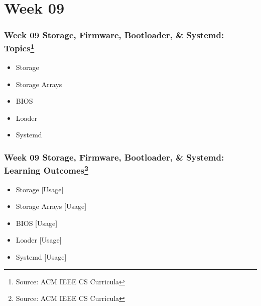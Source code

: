 
\section{Week 09}
\begin{frame}[fragile]
\frametitle{Week 09 Storage, Firmware, Bootloader, \& Systemd:
Topics\footnote{Source: ACM IEEE CS Curricula}}

\begin{itemize}
\item 
Storage
\item
Storage Arrays
\item
BIOS
\item
Loader
\item
Systemd
\end{itemize}
\end{frame}

\begin{frame}[fragile]
\frametitle{Week 09 Storage, Firmware, Bootloader, \& Systemd:
Learning Outcomes\footnote{Source: ACM IEEE CS Curricula}}
\begin{itemize}
\item 
Storage
[Usage]
\item
Storage Arrays
[Usage]
\item
BIOS
[Usage]
\item
Loader
[Usage]
\item
Systemd
[Usage]
\end{itemize}

\end{frame}

